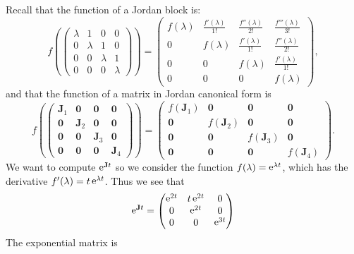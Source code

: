 {\begin{Solution}
\begin{enumerate}
\[    \]
    Recall that the function of a Jordan block is:
    \[
    f \left(
      \begin{pmatrix}
        \lambda & 1 & 0 & 0 \\
        0 & \lambda & 1 & 0 \\
        0 & 0 & \lambda & 1 \\
        0 & 0 & 0 & \lambda
      \end{pmatrix}
    \right)
    = 
    \begin{pmatrix}
      f(\lambda) & \frac{f'(\lambda)}{1!} & \frac{f''(\lambda)}{2!} & 
      \frac{f'''(\lambda)}{3!} \\
      0 & f(\lambda) & \frac{f'(\lambda)}{1!} & \frac{f''(\lambda)}{2!} \\
      0 & 0 & f(\lambda) & \frac{f'(\lambda)}{1!} \\
      0 & 0 & 0 & f(\lambda)
    \end{pmatrix},
    \]
    and that the function of a matrix in Jordan canonical form is
    \[
    f \left(
      \begin{pmatrix}
        \mathbf{J}_1 & \mathbf{0} & \mathbf{0} & \mathbf{0} \\
        \mathbf{0} & \mathbf{J}_2 & \mathbf{0} & \mathbf{0} \\
        \mathbf{0} & \mathbf{0} & \mathbf{J}_3 & \mathbf{0} \\
        \mathbf{0} & \mathbf{0} & \mathbf{0} & \mathbf{J}_4
      \end{pmatrix}
    \right)
    = 
    \begin{pmatrix}
      f(\mathbf{J}_1) & \mathbf{0} & \mathbf{0} & \mathbf{0} \\
      \mathbf{0} & f(\mathbf{J}_2) & \mathbf{0} & \mathbf{0} \\
      \mathbf{0} & \mathbf{0} & f(\mathbf{J}_3) & \mathbf{0} \\
      \mathbf{0} & \mathbf{0} & \mathbf{0} & f(\mathbf{J}_4)
    \end{pmatrix}.
    \]
    We want to compute $\mathop{\mathrm{e}}\nolimits^{\mathbf{J} t}$ so we consider the function 
    $f(\lambda) = \mathop{\mathrm{e}}\nolimits^{\lambda t}$, which has the derivative
    $f'(\lambda) = t \mathop{\mathrm{e}}\nolimits^{\lambda t}$.
    Thus we see that
    \[
    \mathop{\mathrm{e}}\nolimits^{\mathbf{J} t} = 
    \begin{pmatrix}
      \mathop{\mathrm{e}}\nolimits^{2 t} & t \mathop{\mathrm{e}}\nolimits^{2 t} & 0 \\
      0 & \mathop{\mathrm{e}}\nolimits^{2 t} & 0 \\
      0 & 0 & \mathop{\mathrm{e}}\nolimits^{3 t}
    \end{pmatrix}
    \]
    The exponential matrix is

\end{enumerate}
\end{Solution}}
